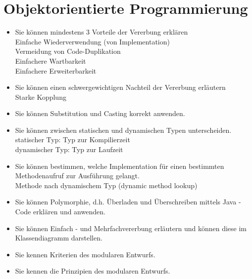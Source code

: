 \documentclass[a4paper, 10pt]{article}
\begin{document}
\section{Objektorientierte Programmierung}
\begin{itemize}
  \item Sie können mindestens 3 Vorteile der Vererbung erklären\\
        Einfache Wiederverwendung (von Implementation) \\
        Vermeidung von Code-Duplikation \\
        Einfachere Wartbarkeit \\
        Einfachere Erweiterbarkeit
  \item Sie können einen schwergewichtigen Nachteil der Vererbung erläutern\\
        Starke Kopplung
  \item Sie können Substitution und Casting korrekt anwenden. \\
        
  \item Sie können zwischen statischen und dynamischen Typen unterscheiden. \\
        statischer Typ: Typ zur Kompilierzeit\\
        dynamischer Typ: Typ zur Laufzeit
  \item Sie können bestimmen, welche Implementation für einen bestimmten Methodenaufruf zur Ausführung gelangt. \\
        Methode nach dynamischem Typ (dynamic method lookup)
  \item Sie können Polymorphie, d.h. Überladen und Überschreiben mittels Java - Code erklären und anwenden. \\
        
  \item Sie können Einfach - und Mehrfachvererbung erläutern und können diese im Klassendiagramm darstellen. \\
        
  \item Sie kennen Kriterien des modularen Entwurfs. \\
        
  \item Sie kennen die Prinzipien des modularen Entwurfs. \\

\end{itemize}
\end{document}
